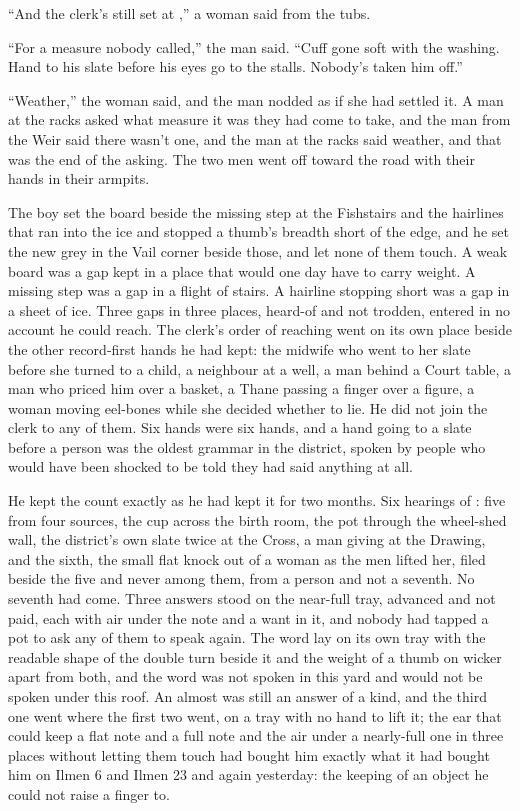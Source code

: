 “And the clerk's still set at ,” a woman said from the tubs.

“For a measure nobody called,” the man said. “Cuff gone soft with the washing. Hand to his slate before his eyes go to the stalls. Nobody's taken him off.”

“Weather,” the woman said, and the man nodded as if she had settled it. A man at the racks asked what measure it was they had come to take, and the man from the Weir said there wasn't one, and the man at the racks said weather, and that was the end of the asking. The two men went off toward the road with their hands in their armpits.

The boy set the board beside the missing step at the Fishstairs and the hairlines that ran into the ice and stopped a thumb's breadth short of the edge, and he set the new grey in the Vail corner beside those, and let none of them touch. A weak board was a gap kept in a place that would one day have to carry weight. A missing step was a gap in a flight of stairs. A hairline stopping short was a gap in a sheet of ice. Three gaps in three places, heard-of and not trodden, entered in no account he could reach. The clerk's order of reaching went on its own place beside the other record-first hands he had kept: the midwife who went to her slate before she turned to a child, a neighbour at a well, a man behind a Court table, a man who priced him over a basket, a Thane passing a finger over a figure, a woman moving eel-bones while she decided whether to lie. He did not join the clerk to any of them. Six hands were six hands, and a hand going to a slate before a person was the oldest grammar in the district, spoken by people who would have been shocked to be told they had said anything at all.

He kept the count exactly as he had kept it for two months. Six hearings of : five from four sources, the cup across the birth room, the pot through the wheel-shed wall, the district's own slate twice at the Cross, a man giving at the Drawing, and the sixth, the small flat knock out of a woman as the men lifted her, filed beside the five and never among them, from a person and not a seventh. No seventh had come. Three answers stood on the near-full tray, advanced and not paid, each with air under the note and a want in it, and nobody had tapped a pot to ask any of them to speak again. The word lay on its own tray with the readable shape of the double turn beside it and the weight of a thumb on wicker apart from both, and the word was not spoken in this yard and would not be spoken under this roof. An almost was still an answer of a kind, and the third one went where the first two went, on a tray with no hand to lift it; the ear that could keep a flat note and a full note and the air under a nearly-full one in three places without letting them touch had bought him exactly what it had bought him on Ilmen 6 and Ilmen 23 and again yesterday: the keeping of an object he could not raise a finger to.

